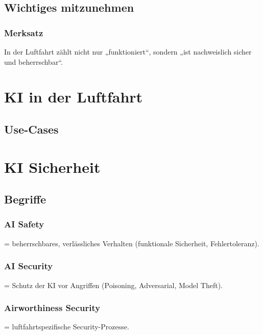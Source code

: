 \section{Wichtiges mitzunehmen}
\subsection{Merksatz}
In der Luftfahrt zählt nicht nur „funktioniert“, sondern „ist nachweislich sicher und beherrschbar“.











\chapter{KI in der Luftfahrt}
\section{Use-Cases} 











\chapter{KI Sicherheit}
\section{Begriffe} 

\subsection{AI Safety}
= beherrschbares, verlässliches Verhalten (funktionale Sicherheit, Fehlertoleranz).

\subsection{AI Security}
= Schutz der KI vor Angriffen (Poisoning, Adversarial, Model Theft).

\subsection{Airworthiness Security}
= luftfahrtspezifische Security-Prozesse.




